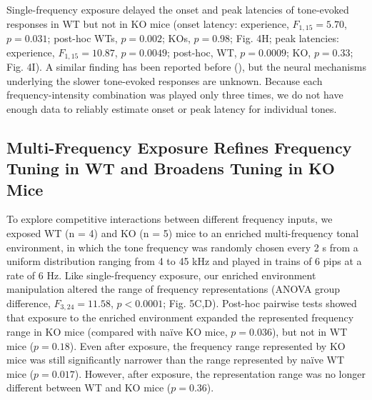 Single-frequency exposure delayed the onset and peak latencies of tone-evoked responses in WT but not in KO mice (onset latency: experience, $F_{1,15}=5.70$, $p=0.031$; post-hoc WTs, $p=0.002$; KOs, $p=0.98$; Fig. 4H; peak latencies: experience, $F_{1,15}=10.87$, $p=0.0049$; post-hoc, WT, $p=0.0009$; KO, $p=0.33$; Fig. 4I). A similar finding has been reported before (\cite{Engineer2004}), but the neural mechanisms underlying the slower tone-evoked responses are unknown. Because each frequency-intensity combination was played only three times, we do not have enough data to reliably estimate onset or peak latency for individual tones.

\subsection{Multi-Frequency Exposure Refines Frequency Tuning in WT and Broadens Tuning in KO Mice}

To explore competitive interactions between different frequency inputs, we exposed WT (n = 4) and KO (n = 5) mice to an enriched multi-frequency tonal environment, in which the tone frequency was randomly chosen every 2 s from a uniform distribution ranging from 4 to 45 kHz and played in trains of 6 pips at a rate of 6 Hz. Like single-frequency exposure, our enriched environment manipulation altered the range of frequency representations (ANOVA group difference, $F_{3,24}=11.58$, $p<0.0001$; Fig. 5C,D). Post-hoc pairwise tests showed that exposure to the enriched environment expanded the represented frequency range in KO mice (compared with na\"ive KO mice, $p=0.036$), but not in WT mice ($p=0.18$). Even after exposure, the frequency range represented by KO mice was still significantly narrower than the range represented by na\"ive WT mice ($p=0.017$). However, after exposure, the representation range was no longer different between WT and KO mice ($p=0.36$).

